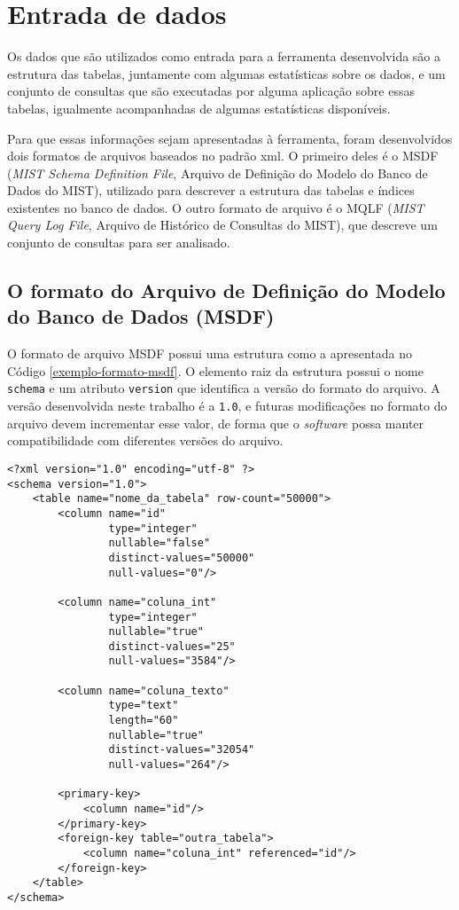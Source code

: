 \section{Entrada de dados}
\label{entrada-de-dados}

Os dados que são utilizados como entrada para a ferramenta desenvolvida são a estrutura das tabelas, juntamente com algumas estatísticas sobre os dados, e um conjunto de consultas que são executadas por alguma aplicação sobre essas tabelas, igualmente acompanhadas de algumas estatísticas disponíveis.

Para que essas informações sejam apresentadas à ferramenta, foram desenvolvidos dois formatos de arquivos baseados no padrão \gls{xml}. O primeiro deles é o MSDF (\textit{MIST Schema Definition File}, Arquivo de Definição do Modelo do Banco de Dados do MIST), utilizado para descrever a estrutura das tabelas e índices existentes no banco de dados. O outro formato de arquivo é o MQLF (\textit{MIST Query Log File}, Arquivo de Histórico de Consultas do MIST), que descreve um conjunto de consultas para ser analisado.

\subsection{O formato do Arquivo de Definição do Modelo do Banco de Dados (MSDF)}
\label{formato-msdf}

O formato de arquivo MSDF possui uma estrutura como a apresentada no Código \ref{exemplo-formato-msdf}. O elemento raiz da estrutura possui o nome \texttt{schema} e um atributo \texttt{version} que identifica a versão do formato do arquivo. A versão desenvolvida neste trabalho é a \texttt{1.0}, e futuras modificações no formato do arquivo devem incrementar esse valor, de forma que o \textit{software} possa manter compatibilidade com diferentes versões do arquivo.

\begin{lstlisting}[label=exemplo-formato-msdf, caption={Exemplo de arquivo no formato MSDF.}]
<?xml version="1.0" encoding="utf-8" ?>
<schema version="1.0">
    <table name="nome_da_tabela" row-count="50000">
        <column name="id"
                type="integer"
                nullable="false"
                distinct-values="50000"
                null-values="0"/>

        <column name="coluna_int"
                type="integer"
                nullable="true"
                distinct-values="25"
                null-values="3584"/>

        <column name="coluna_texto"
                type="text"
                length="60"
                nullable="true"
                distinct-values="32054"
                null-values="264"/>

        <primary-key>
            <column name="id"/>
        </primary-key>
        <foreign-key table="outra_tabela">
            <column name="coluna_int" referenced="id"/>
        </foreign-key>
    </table>
</schema>
\end{lstlisting}

